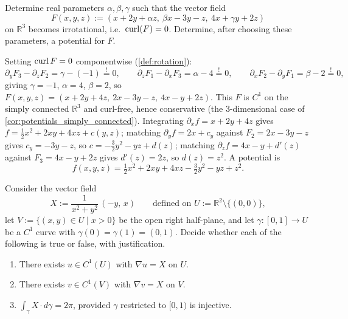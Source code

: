 \begin{exercise}
\label{ex:choose_parameters_irrotational}
Determine real parameters $\alpha,\beta,\gamma$ such that the vector field
\[F(x,y,z) := (x+2y+\alpha z,\ \beta x-3y-z,\ 4x+\gamma y+2z)\]
on $\mathbb{R}^3$ becomes irrotational, i.e.\ $\operatorname{curl}(F)=0$. Determine, after choosing these
parameters, a potential for $F$.
\end{exercise}

\begin{exercisesolution}
Setting $\operatorname{curl} F = 0$ componentwise (\cref{def:rotation}):
\[\partial_yF_3-\partial_zF_2 = \gamma-(-1) \overset{!}{=} 0, \qquad
  \partial_zF_1-\partial_xF_3 = \alpha-4 \overset{!}{=} 0, \qquad
  \partial_xF_2-\partial_yF_1 = \beta-2 \overset{!}{=} 0,\]
giving $\gamma=-1$, $\alpha=4$, $\beta=2$, so
$F(x,y,z) = (x+2y+4z,\ 2x-3y-z,\ 4x-y+2z)$. This $F$ is $C^1$ on the simply connected
$\mathbb{R}^3$ and curl-free, hence conservative (the $3$-dimensional case of
\cref{cor:potentials_simply_connected}). Integrating $\partial_xf = x+2y+4z$ gives
$f = \tfrac12x^2+2xy+4xz+c(y,z)$; matching $\partial_yf = 2x+c_y$ against $F_2=2x-3y-z$ gives
$c_y=-3y-z$, so $c = -\tfrac32y^2-yz+d(z)$; matching
$\partial_zf = 4x-y+d'(z)$ against $F_3=4x-y+2z$ gives $d'(z)=2z$, so $d(z)=z^2$. A potential is
\[f(x,y,z) = \tfrac12x^2+2xy+4xz-\tfrac32y^2-yz+z^2.\]
\end{exercisesolution}

\begin{exercise}
\label{ex:angle_field_true_false}
Consider the vector field
\[X := \frac{1}{x^2+y^2}\,(-y,\, x) \qquad \text{defined on } U := \mathbb{R}^2 \setminus \{(0,0)\},\]
let $V := \{(x,y) \in U \mid x > 0\}$ be the open right half-plane, and let $\gamma : [0,1] \to U$ be
a $C^1$ curve with $\gamma(0) = \gamma(1) = (0,1)$. Decide whether each of the following is true or
false, with justification.
\begin{enumerate}[label=\textbf{(\alph*)}]
  \item There exists $u \in C^1(U)$ with $\nabla u = X$ on $U$.
  \item There exists $v \in C^1(V)$ with $\nabla v = X$ on $V$.
  \item $\int_\gamma X \cdot d\gamma = 2\pi$, provided $\gamma$ restricted to $[0,1)$ is injective.
\end{enumerate}
\end{exercise}


